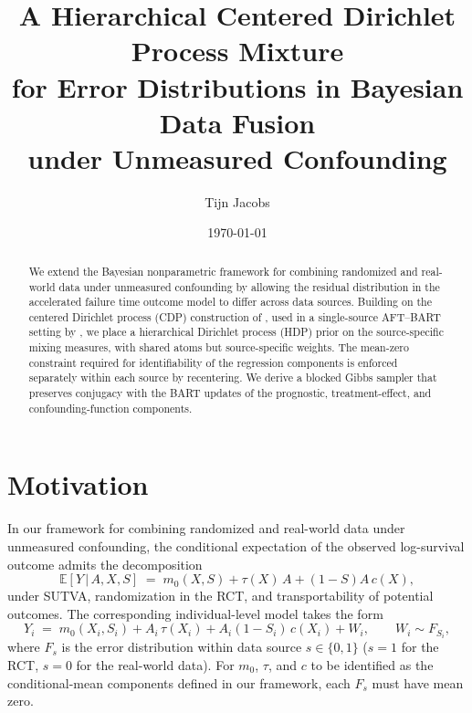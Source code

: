 \documentclass[11pt]{article}
\title{A Hierarchical Centered Dirichlet Process Mixture\\
       for Error Distributions in Bayesian Data Fusion\\
       under Unmeasured Confounding}
\author{Tijn Jacobs}
\date{\today}
\theoremstyle{plain}
\theoremstyle{definition}
\theoremstyle{remark}
\newcommand{\E}{\mathbb{E}}
\newcommand{\1}{\mathds{1}}
\newcommand{\given}{\,|\,}
\begin{document}
\maketitle

\begin{abstract}
We extend the Bayesian nonparametric framework for combining randomized and real-world data under unmeasured confounding by allowing the residual distribution in the accelerated failure time outcome model to differ across data sources. Building on the centered Dirichlet process (CDP) construction of \citet{yang2010semiparametric}, used in a single-source AFT--BART setting by \citet{henderson2020individualized}, we place a hierarchical Dirichlet process (HDP) prior \citep{teh2006hierarchical} on the source-specific mixing measures, with shared atoms but source-specific weights. The mean-zero constraint required for identifiability of the regression components is enforced separately within each source by recentering. We derive a blocked Gibbs sampler that preserves conjugacy with the BART updates of the prognostic, treatment-effect, and confounding-function components.
\end{abstract}

\section{Motivation}

In our framework for combining randomized and real-world data under unmeasured confounding, the conditional expectation of the observed log-survival outcome admits the decomposition
\begin{equation}
\E[Y \given A, X, S] \;=\; m_0(X, S) + \tau(X)\, A + (1 - S) A\, c(X),
\label{eq:cmean}
\end{equation}
under SUTVA, randomization in the RCT, and transportability of potential outcomes. The corresponding individual-level model takes the form
\begin{equation}
Y_i \;=\; m_0(X_i, S_i) + A_i\, \tau(X_i) + A_i(1 - S_i)\, c(X_i) + W_i, \qquad W_i \sim F_{S_i},
\label{eq:outcome}
\end{equation}
where $F_s$ is the error distribution within data source $s \in \{0, 1\}$ ($s=1$ for the RCT, $s=0$ for the real-world data). For $m_0$, $\tau$, and $c$ to be identified as the conditional-mean components defined in our framework, each $F_s$ must have mean zero.
\end{document}
